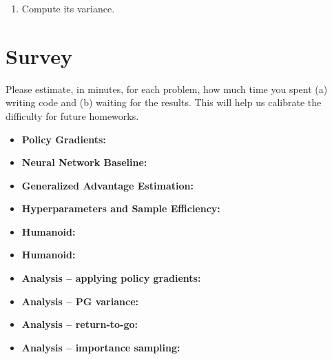 \documentclass{article}
\begin{document}
\begin{enumerate}
\begin{enumerate}
    \item Compute its variance.

\end{enumerate}

\end{enumerate}

\newpage\section{Survey}
\label{sec:survey}
Please estimate, in minutes, for each problem, how much time you spent (a) writing code and (b) waiting for the results. This will help us calibrate the difficulty for future homeworks. 
\begin{itemize}
    \item \textbf{Policy Gradients:}
    \item \textbf{Neural Network Baseline:}
    \item \textbf{Generalized Advantage Estimation:}
    \item \textbf{Hyperparameters and Sample Efficiency:}
    \item \textbf{Humanoid:}
    \item \textbf{Humanoid:}
    \item \textbf{Analysis -- applying policy gradients:}
    \item \textbf{Analysis -- PG variance:}
    \item \textbf{Analysis -- return-to-go:}
    \item \textbf{Analysis -- importance sampling:}
\end{itemize}
\end{document}
